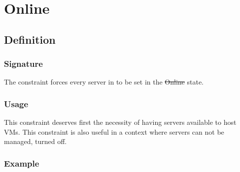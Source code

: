 \section{Online}

\subsection{Definition}

\subsubsection{Signature} 

The  constraint forces every server in  to be set in the \st{Online} state.

\subsubsection{Usage}

This constraint deserves first the necessity of having servers available to host VMs.
This constraint is also useful in a context where servers can not be managed, \ie turned off.


\subsubsection{Example}

